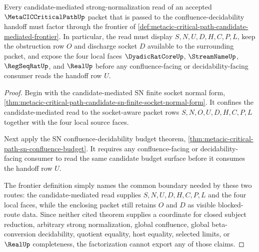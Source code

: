 \begin{theorem}\label{thm:metacic-critical-path-candidate-mediated-sn-frontier}
Every candidate-mediated strong-normalization read of an accepted $\MetaCICCriticalPathUp$ packet that is passed to the confluence-decidability handoff must factor through the frontier of \autoref{def:metacic-critical-path-candidate-mediated-frontier}. In particular, the read must display $S,N,U,D,H,C,P,L$, keep the obstruction row $O$ and discharge socket $D$ available to the surrounding packet, and expose the four local faces $\DyadicRatCoreUp$, $\StreamNameUp$, $\RegSeqRatUp$, and $\RealUp$ before any confluence-facing or decidability-facing consumer reads the handoff row $U$.
\end{theorem}
\begin{proof}
Begin with the candidate-mediated SN finite socket normal form, \autoref{thm:metacic-critical-path-candidate-sn-finite-socket-normal-form}. It confines the candidate-mediated read to the socket-aware packet rows $S,N,O,U,D,H,C,P,L$ together with the four local source faces.

Next apply the SN confluence-decidability budget theorem, \autoref{thm:metacic-critical-path-sn-confluence-budget}. It requires any confluence-facing or decidability-facing consumer to read the same candidate budget surface before it consumes the handoff row $U$.

The frontier definition simply names the common boundary needed by these two routes: the candidate-mediated read supplies $S,N,U,D,H,C,P,L$ and the four local faces, while the enclosing packet still retains $O$ and $D$ as visible blocked-route data. Since neither cited theorem supplies a coordinate for closed subject reduction, arbitrary strong normalization, global confluence, global beta-conversion decidability, quotient equality, host equality, selected limits, or $\RealUp$ completeness, the factorization cannot export any of those claims.
\end{proof}


